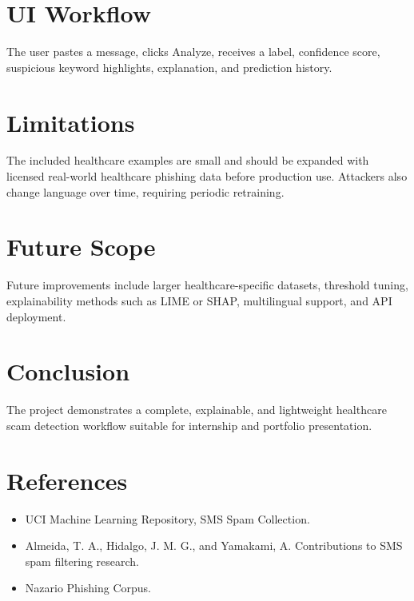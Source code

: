 \documentclass[12pt]{article}
\begin{document}
\section{UI Workflow}
The user pastes a message, clicks Analyze, receives a label, confidence score, suspicious keyword highlights, explanation, and prediction history.

\section{Limitations}
The included healthcare examples are small and should be expanded with licensed real-world healthcare phishing data before production use. Attackers also change language over time, requiring periodic retraining.

\section{Future Scope}
Future improvements include larger healthcare-specific datasets, threshold tuning, explainability methods such as LIME or SHAP, multilingual support, and API deployment.

\section{Conclusion}
The project demonstrates a complete, explainable, and lightweight healthcare scam detection workflow suitable for internship and portfolio presentation.

\section{References}
\begin{itemize}
\item UCI Machine Learning Repository, SMS Spam Collection.
\item Almeida, T. A., Hidalgo, J. M. G., and Yamakami, A. Contributions to SMS spam filtering research.
\item Nazario Phishing Corpus.
\end{itemize}
\end{document}
